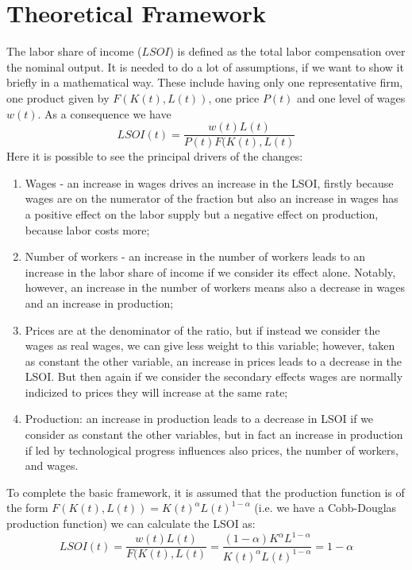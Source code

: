 \documentclass[12pt, letterpaper]{article}
\numberwithin{table}{section}   %
\begin{document}
\section{Theoretical Framework}\label{sec_3}
The labor share of income ($LSOI$) is defined as the total labor compensation over the nominal output. It is needed to do a lot of assumptions, if we want to show it briefly in a mathematical way. These include having only one representative firm, one product given by $F(K(t),L(t))$, one price $P(t)$ and one level of wages $w(t)$. As a consequence we have
\begin{equation*}
    LSOI(t) = \frac{w(t)L(t)}{P(t)F(K(t),L(t)}
\end{equation*}
Here it is possible to see the principal drivers of the changes: 
\begin{enumerate}
    \item Wages - an increase in wages drives an increase in the LSOI, firstly because wages are on the numerator of the fraction but also an increase in wages has a positive effect on the labor supply but a negative effect on production, because labor costs more;
    \item Number of workers - an increase in the number of workers leads to an increase in the labor share of income if we consider its effect alone. Notably, however, an increase in the number of workers means also a decrease in wages and an increase in production;
    \item Prices are at the denominator of the ratio, but if instead we consider the wages as real wages, we can give less weight to  this variable; however, taken as constant the other variable, an increase in prices leads to a decrease in the LSOI. But then again if we consider the secondary effects wages are normally indicized to prices they will increase at the same rate;
    \item Production: an increase in production leads to a decrease in LSOI if we consider as constant the other variables, but in fact an increase in production if led by technological progress influences also prices, the number of workers, and wages.
\end{enumerate}
To complete the basic framework, it is assumed that the production function is of the form $F(K(t),L(t)) = K(t)^\alpha L(t)^{1-\alpha}$ (i.e. we have a Cobb-Douglas production function) we can calculate the LSOI as:
\begin{equation*}
    LSOI(t) = \frac{w(t)L(t)}{F(K(t),L(t)} = \frac{(1-\alpha)K^{\alpha} L^{1-\alpha}}{K(t)^{\alpha} L(t)^{1-\alpha}} = 1 - \alpha
\end{equation*}
\end{document}
